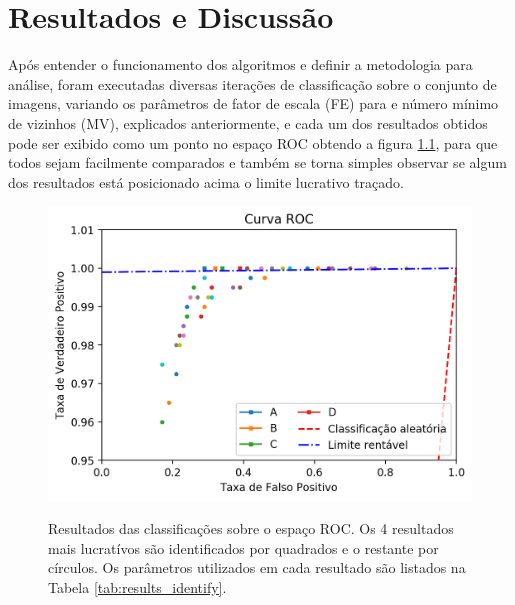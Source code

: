 \chapter{Resultados e Discussão}\label{cap:resultados}

Após entender o funcionamento dos algoritmos e definir a metodologia para análise, foram executadas diversas iterações de classificação sobre o conjunto de imagens, variando os parâmetros de fator de escala (FE) para e número mínimo de vizinhos (MV), explicados anteriormente, e cada um dos resultados obtidos pode ser exibido como um ponto no espaço ROC obtendo a figura \ref{fig:results_roc}, para que todos sejam facilmente comparados e também se torna simples observar se algum dos resultados está posicionado acima o limite lucrativo traçado.

\begin{figure}[htbp]
     \centering
     \caption{Resultados das classificações sobre o espaço ROC. Os 4 resultados mais lucratívos são identificados por quadrados e o restante por círculos. Os parâmetros utilizados em cada resultado são listados na Tabela \ref{tab:results_identify}.}
     \includegraphics[scale=1]{figs/curva_roc_results.png}
     \label{fig:results_roc}
 \end{figure}

